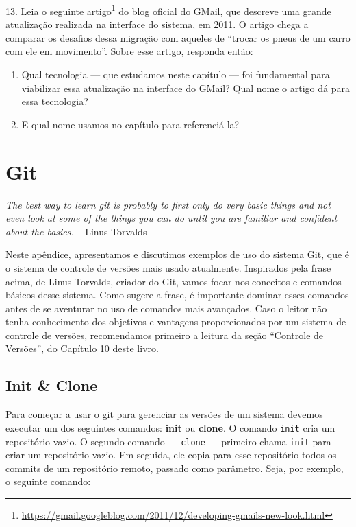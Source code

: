 \documentclass[
  11pt,
  twoside]{book}
\newcommand{\passthrough}[1]{#1}
\DeclareRobustCommand{\href}[2]{#2\footnote{\url{#1}}}
\renewenvironment{quote}{\centering \vspace{1.5ex} \begin{tcolorbox}[colback=backcolor, width=4.9in]}{\end{tcolorbox}}
\begin{document}
13. Leia o seguinte
\href{https://gmail.googleblog.com/2011/12/developing-gmails-new-look.html}{artigo}
do blog oficial do GMail, que descreve uma grande atualização realizada
na interface do sistema, em 2011. O artigo chega a comparar os desafios
dessa migração com aqueles de ``trocar os pneus de um carro com ele em
movimento''. Sobre esse artigo, responda então:

\begin{enumerate}
\def\labelenumi{\alph{enumi}.}
\item
  Qual tecnologia --- que estudamos neste capítulo --- foi fundamental
  para viabilizar essa atualização na interface do GMail? Qual nome o
  artigo dá para essa tecnologia?
\item
  E qual nome usamos no capítulo para referenciá-la?
\end{enumerate}

\appendix

\hypertarget{git}{%
\chapter{Git}\label{git}}

\begin{quote}
\emph{The best way to learn git is probably to first only do very basic
things and not even look at some of the things you can do until you are
familiar and confident about the basics.} -- Linus Torvalds
\end{quote}

  Neste apêndice, apresentamos e
discutimos exemplos de uso do sistema Git, que é o sistema de controle
de versões mais usado atualmente. Inspirados pela frase acima, de Linus
Torvalds, criador do Git, vamos focar nos conceitos e comandos básicos
desse sistema. Como sugere a frase, é importante dominar esses comandos
antes de se aventurar no uso de comandos mais avançados. Caso o leitor
não tenha conhecimento dos objetivos e vantagens proporcionados por um
sistema de controle de versões, recomendamos primeiro a leitura da seção
``Controle de Versões'', do Capítulo 10 deste livro.

\hypertarget{init-clone}{%
\section{Init \& Clone}\label{init-clone}}

 

Para começar a usar o git para gerenciar as versões de um sistema
devemos executar um dos seguintes comandos: \textbf{init} ou
\textbf{clone}. O comando \passthrough{\lstinline!init!} cria um
repositório vazio. O segundo comando --- \passthrough{\lstinline!clone!}
--- primeiro chama \passthrough{\lstinline!init!} para criar um
repositório vazio. Em seguida, ele copia para esse repositório todos os
commits de um repositório remoto, passado como parâmetro. Seja, por
exemplo, o seguinte comando:
\end{document}
